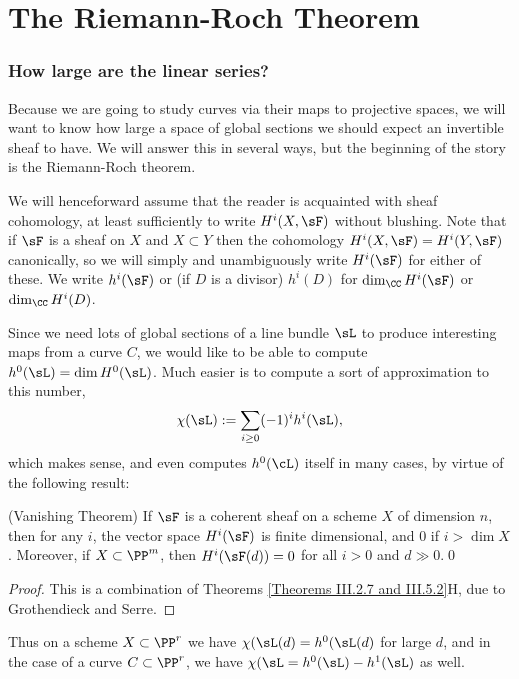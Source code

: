 

\chapter{The Riemann-Roch Theorem}

\subsection{How large are the linear series?}

Because we are going to study curves via their maps to projective spaces, we will want to know how large a space of global
sections we should expect an invertible sheaf to have. We will answer this in several ways, but the beginning
of the story is the Riemann-Roch theorem.

We will henceforward assume that the reader is acquainted with sheaf cohomology, at least sufficiently to write
$H^i(X, \sF)$ without blushing. Note that if $\sF$ is a sheaf on $X$ and $X\subset Y$ then the cohomology  $H^i(X, \sF) = H^i(Y,\sF)$ canonically, so we will
simply and unambiguously write $H^i(\sF)$ for either of these. 
We write $h^i(\sF)$ or (if $D$ is a divisor) $h^{i}(D)$ for $\dim_{\CC}H^i(\sF)$ or $\dim_{\CC}H^i(D)$. 

Since we need lots of global sections of a line bundle $\sL$ to produce interesting maps from a curve $C$, we would like to be able to compute  $h^0(\sL) = \dim H^0(\sL)$. Much easier is to compute a sort of approximation to this number,
$$
\chi(\sL):= \sum_{i\geq 0} (-1)^i h^i(\sL),
$$
which makes sense, and even computes $h^0(\cL)$ itself in many cases, by virtue of the following result:

\begin{theorem} (Vanishing Theorem)
If $\sF$ is a coherent sheaf on a scheme $X$ of dimension $n$, then for any $i$, the vector space $H^i(\sF)$ is finite dimensional, and 0 if  $i>\dim X$. Moreover,
if $X\subset \PP^m$, then $H^i(\sF(d)) = 0$ for all $i>0$ and $d\gg 0$.\qed
\end{theorem}

\begin{proof}
This is a combination of Theorems \ref{Theorems III.2.7 and III.5.2}{H}, due to Grothendieck and Serre.
\end{proof}

Thus on a scheme $X\subset \PP^r$ we have $\chi(\sL(d) = h^0(\sL(d)$ for large $d$, and in the case of a curve $C\subset \PP^r$, we have $\chi(\sL = h^0(\sL) - h^1(\sL)$ as well.

